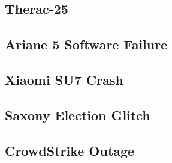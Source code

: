 \subsection{Therac-25} %
\begin{frame}{\insertsubsection}
	\slideTherac
\end{frame}

\subsection{Ariane 5 Software Failure} %
\begin{frame}{\insertsubsection}
	\slideArianeFailure
\end{frame}

\subsection{Xiaomi SU7 Crash} %
\begin{frame}{\insertsubsection}
	\slideXiaomiCrash
\end{frame}

\subsection{Saxony Election Glitch} %
\begin{frame}{\insertsubsection}
	\slideSaxonyElection
\end{frame}


\subsection{CrowdStrike Outage} %
\begin{frame}{\insertsubsection}
	\slideCrowdStrike
\end{frame}




